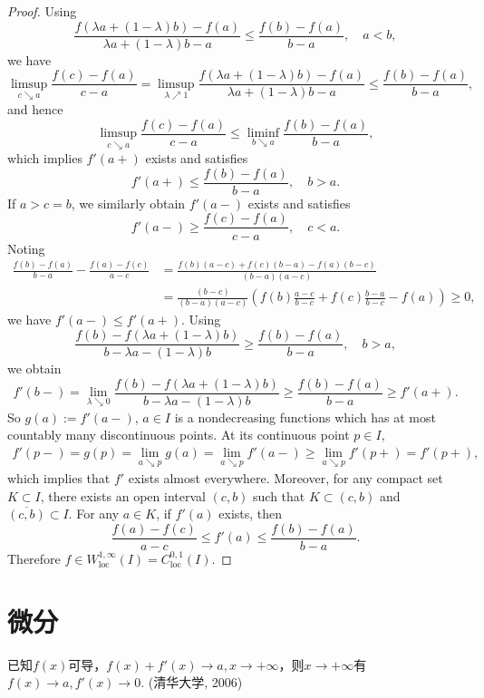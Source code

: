 \begin{proof}
	Using 
	\[
	\frac{f(\lambda a + (1-\lambda)b) - f(a)}{\lambda a + (1-\lambda)b - a} \leq \frac{f(b) - f(a)}{b-a},\quad a < b,
	\]
	we have
	\[
	\limsup_{c\searrow a}\frac{f(c)-f(a)}{c-a} 
	= \limsup_{\lambda\nearrow 1}\frac{f(\lambda a + (1-\lambda)b) - f(a)}{\lambda a + (1-\lambda)b - a} 
	\leq \frac{f(b) - f(a)}{b-a},
	\]
	and hence 
	\[
	\limsup_{c\searrow a}\frac{f(c)-f(a)}{c-a} 
	\leq \liminf_{b\searrow a}\frac{f(b)-f(a)}{b-a},
	\]
	which implies $f'(a+)$ exists and satisfies 
	\[
	f'(a+)\leq \frac{f(b) - f(a)}{b-a},\quad b>a.
	\]
	If $a>c=b$, we similarly obtain $f'(a-)$ exists and satisfies 
	\[
	f'(a-)\geq \frac{f(c) - f(a)}{c-a},\quad c<a.
	\]
	Noting 
	\begin{align*}
	\frac{f(b) - f(a)}{b-a} - \frac{f(a) - f(c)}{a-c}
	&= \frac{f(b)(a-c) + f(c)(b-a) - f(a)(b-c)}{(b-a)(a-c)}\\
	&= \frac{(b-c)}{(b-a)(a-c)}\left(f(b)\frac{a-c}{b-c} + f(c)\frac{b-a}{b-c} - f(a) \right)\geq 0,
	\end{align*}
	we have $f'(a-)\leq f'(a+)$.
	Using 
	\[
	\frac{f(b) - f(\lambda a + (1-\lambda)b)}{b - \lambda a - (1-\lambda)b} \geq \frac{f(b) - f(a)}{b-a},\quad b>a,
	\]
	we obtain
	\[
	f'(b-) = \lim_{\lambda\searrow0}\frac{f(b) - f(\lambda a + (1-\lambda)b)}{b - \lambda a - (1-\lambda)b}\geq \frac{f(b) - f(a)}{b-a}\geq f'(a+).
	\]
	So $g(a) := f'(a-)$, $a\in I$ is a nondecreasing functions 
	which has at most countably many  discontinuous points.
	At its continuous point $p\in I$,
	\begin{align*}
		f'(p-) = g(p) = \lim_{a\searrow p}g(a) 
		= \lim_{a\searrow p} f'(a-) \geq \lim_{a\searrow p}f'(p+) = f'(p+),
	\end{align*} 
	which implies that $f'$ exists almost everywhere.
	Moreover, for any compact set $K\subset I$, 
	there exists an open interval $(c,b)$ such that $K\subset(c,b)$ and $\overline{(c,b)}\subset I$. 
	For any $a\in K$, if $f'(a)$ exists, 
	then  
	\[
	\frac{f(a) - f(c)}{a - c} 
	\leq f'(a) \leq \frac{f(b) - f(a)}{b - a}.
	\] 
	Therefore $f\in W^{1,\infty}_{\mathrm{loc}}(I) = C^{0,1}_{\mathrm{loc}}(I)$.
\end{proof}



\section{微分}
  \begin{example}
   已知$f(x)$可导，$f(x)+f'(x)\rightarrow a,x\rightarrow+\infty$，则$x\rightarrow+\infty$有$f(x)\rightarrow a,f'(x)\rightarrow0$. (清华大学, 2006)
  \end{example} 

